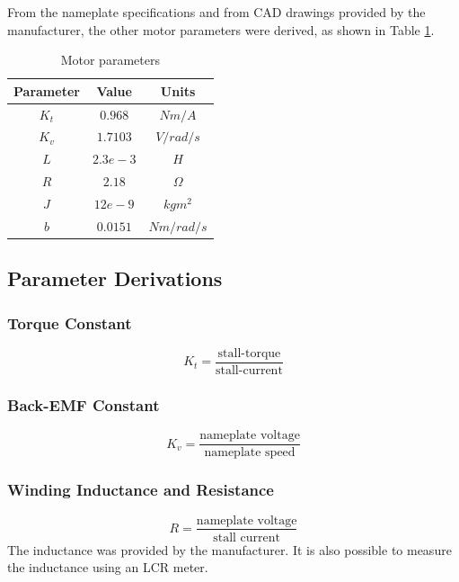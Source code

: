 \documentclass{report}
\begin{document}
From the nameplate specifications and from CAD drawings provided by the manufacturer, the other motor parameters were derived, as shown in Table \ref{table:pololu_motor_params}.


\begin{table}
\begin{center}
\begin{tabular}{|c|c|c|}
\hline
\textbf{Parameter} & \textbf{Value} & \textbf{Units} \\
\hline \hline
$K_t$ & $0.968$ & $Nm/A$ \\
\hline
$K_v$ & $1.7103$ & $V/rad/s$ \\
\hline
$L$ & $2.3e-3$ & $H$ \\
\hline
$R$ & $2.18$ & $\Omega$ \\
\hline
$J$ & $12e-9$ & $kgm^2$ \\
\hline
$b$ & $0.0151$ & $Nm/rad/s$ \\
\hline
\end{tabular}
\caption{Motor parameters} \label{table:pololu_motor_params}
\end{center}
\end{table}

\subsection{Parameter Derivations}

\subsubsection{Torque Constant}
\begin{equation}
K_t = \frac{\text{stall-torque}}{\text{stall-current}}
\end{equation}

\subsubsection{Back-EMF Constant}
\begin{equation}
K_v = \frac{\text{nameplate voltage}}{\text{nameplate speed}}
\end{equation}

\subsubsection{Winding Inductance and Resistance}
\begin{equation}
R = \frac{\text{nameplate voltage}}{\text{stall current}}
\end{equation}
The inductance was provided by the manufacturer. It is also possible to measure the inductance using an LCR meter.
\end{document}
